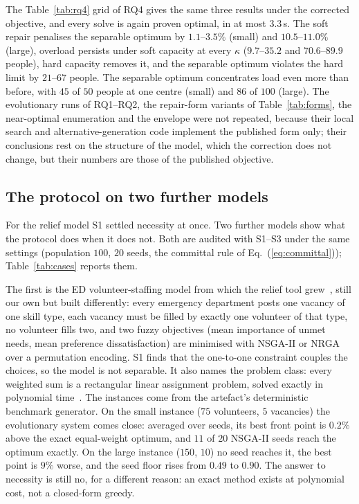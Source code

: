 \documentclass[systems,article,submit,moreauthors,pdftex]{Definitions/mdpi}
\begin{document}
The Table~\ref{tab:rq4} grid of RQ4 gives the same three results under the corrected objective,
and every solve is again proven optimal, in at most $3.3$\,s. The soft repair penalises the separable optimum by $1.1$--$3.5\%$ (small) and
$10.5$--$11.0\%$ (large), overload persists under soft capacity at every $\kappa$ ($9.7$--$35.2$
and $70.6$--$89.9$ people), hard capacity removes it, and the separable optimum violates the hard
limit by $21$--$67$ people. The separable optimum concentrates load even more than before, with
$45$ of $50$ people at one centre (small) and $86$ of $100$ (large). The evolutionary runs of
RQ1--RQ2, the repair-form variants of Table~\ref{tab:forms}, the near-optimal enumeration and the envelope were not repeated, because their local
search and alternative-generation code implement the published form only; their conclusions
rest on the structure of the model, which the correction does not change, but their numbers are
those of the published objective.

\subsection{The protocol on two further models}\label{sec:cases}
For the relief model S1 settled necessity at once. Two further models show what the protocol
does when it does not. Both are audited with S1--S3 under the same settings (population $100$,
$20$ seeds, the committal rule of Eq.~(\ref{eq:committal})); Table~\ref{tab:cases} reports them.

The first is the ED volunteer-staffing model from which the relief tool
grew~\cite{rabiei2023volunteer}, still our own but built differently: every emergency department
posts one vacancy of one skill type, each vacancy must be filled by exactly one volunteer of that
type, no volunteer fills two, and two fuzzy objectives (mean importance of unmet needs, mean
preference dissatisfaction) are minimised with NSGA-II or NRGA over a permutation encoding. S1
finds that the one-to-one constraint couples the choices, so the model is not separable. It also
names the problem class: every weighted sum is a rectangular linear assignment problem, solved
exactly in polynomial time~\cite{kuhn1955hungarian}. The instances come from the artefact's
deterministic benchmark generator. On the small instance ($75$ volunteers,
$5$ vacancies) the evolutionary system comes close: averaged over seeds, its best front point is
$0.2\%$ above the exact equal-weight optimum, and $11$ of $20$ NSGA-II seeds reach the optimum
exactly. On the large instance
($150$, $10$) no seed reaches it, the best point is $9\%$ worse, and the seed floor rises from
$0.49$ to $0.90$. The answer to necessity is still no, for a different reason: an exact method
exists at polynomial cost, not a closed-form greedy.
\end{document}
